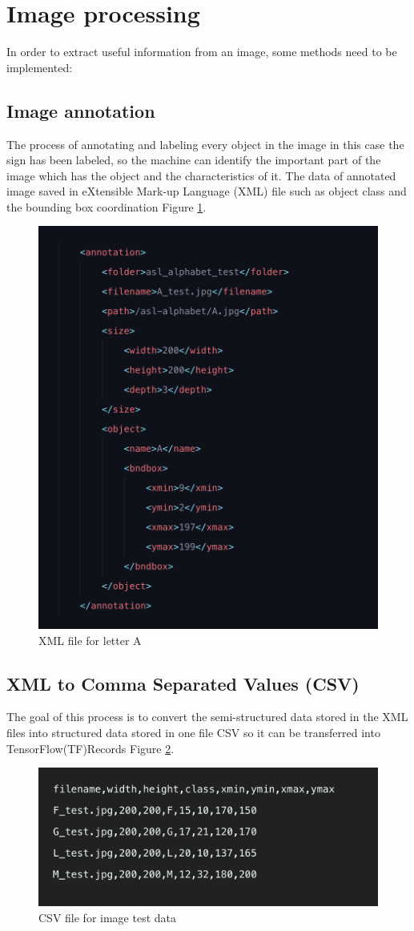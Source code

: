 \documentclass[12pt]{report}
\begin{document}
\newpage
\section{Image processing}
In order to extract useful information from an image, 
some methods need to be implemented:
\subsection{Image annotation}
The process of annotating and labeling every object in 
the image in this case the sign has been labeled, 
so the machine can identify the important part of the 
image which has the object and the characteristics of it.
The data of annotated image saved in eXtensible Mark-up 
Language (XML) file such as object class and the bounding 
box coordination Figure \ref{fig:annotation}.
\newline
\begin{figure} [h]
    \centering
    \includegraphics[width=.6\textwidth]{./images/annotation.png}
    \caption{XML file for letter A}
    \label{fig:annotation}
\end{figure}

\newpage
\subsection{XML to Comma Separated Values (CSV)}
The goal of this process is to convert the semi-structured data 
stored in the XML files into structured data stored in one file 
CSV so it can be transferred into TensorFlow(TF)Records Figure \ref{fig:csv}.
\newline
\begin{figure} [h]
    \centering
    \includegraphics[width=.6\textwidth]{./images/csv.png}
    \caption{CSV file for image test data}
    \label{fig:csv}
\end{figure}
\end{document}
